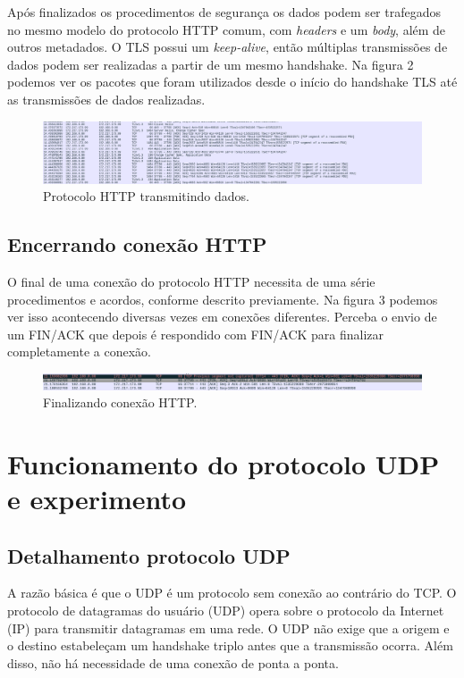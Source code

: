 \documentclass[12pt]{article}
\begin{document}
Após finalizados os procedimentos de segurança os dados podem ser trafegados no mesmo modelo do protocolo HTTP comum, com \emph{headers} e um \emph{body}, além de outros metadados. O TLS possui um \emph{keep-alive}, então múltiplas transmissões de dados podem ser realizadas a partir de um mesmo handshake. Na figura 2 podemos ver os pacotes que foram utilizados desde o início do handshake TLS até as transmissões de dados realizadas.

\begin{figure}[H]
    \centering
    \includegraphics[width=\linewidth]{transmissao.png}
    \caption{Protocolo HTTP transmitindo dados.}
\end{figure}

\subsection{Encerrando conexão HTTP}

O final de uma conexão do protocolo HTTP necessita de uma série procedimentos e acordos, conforme descrito previamente. Na figura 3 podemos ver isso acontecendo diversas vezes em conexões diferentes. Perceba o envio de um FIN/ACK que depois é respondido com FIN/ACK para finalizar completamente a conexão.

\begin{figure}[H]
    \centering
    \includegraphics[width=\linewidth]{final.png}
    \caption{Finalizando conexão HTTP.}
\end{figure}

\section{Funcionamento do protocolo UDP e experimento}
\subsection{Detalhamento protocolo UDP}
A razão básica é que o UDP é um protocolo sem conexão ao contrário do TCP. O protocolo de datagramas do usuário (UDP) opera sobre o protocolo da Internet (IP) para transmitir datagramas em uma rede. O UDP não exige que a origem e o destino estabeleçam um handshake triplo antes que a transmissão ocorra. Além disso, não há necessidade de uma conexão de ponta a ponta.
\end{document}
